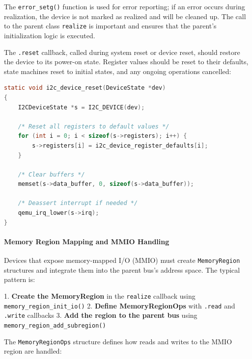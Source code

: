 The \texttt{error\_setg()} function is used for error reporting; if an error occurs during realization, the device is not marked as realized and will be cleaned up. The call to the parent class \texttt{realize} is important and ensures that the parent's initialization logic is executed.

The \texttt{.reset} callback, called during system reset or device reset, should restore the device to its power-on state. Register values should be reset to their defaults, state machines reset to initial states, and any ongoing operations cancelled:

\begin{lstlisting}[language=C, style=small, caption=Device reset callback pattern]
static void i2c_device_reset(DeviceState *dev)
{
    I2CDeviceState *s = I2C_DEVICE(dev);
    
    /* Reset all registers to default values */
    for (int i = 0; i < sizeof(s->registers); i++) {
        s->registers[i] = i2c_device_register_defaults[i];
    }
    
    /* Clear buffers */
    memset(s->data_buffer, 0, sizeof(s->data_buffer));
    
    /* Deassert interrupt if needed */
    qemu_irq_lower(s->irq);
}
\end{lstlisting}

\paragraph{Memory Region Mapping and MMIO Handling}

Devices that expose memory-mapped I/O (MMIO) must create \texttt{MemoryRegion} structures and integrate them into the parent bus's address space. The typical pattern is:

1. \textbf{Create the MemoryRegion} in the \texttt{realize} callback using \texttt{memory\_region\_init\_io()}
2. \textbf{Define MemoryRegionOps} with \texttt{.read} and \texttt{.write} callbacks
3. \textbf{Add the region to the parent bus} using \texttt{memory\_region\_add\_subregion()}

The \texttt{MemoryRegionOps} structure defines how reads and writes to the MMIO region are handled:

